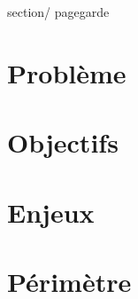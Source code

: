 \documentclass[french, 11pt, a4paper]{article}
\begin{document}
\thispagestyle {plain}

 {section/} {pagegarde}
\newpage

\tableofcontents
\newpage

\section {Problème}


\section {Objectifs}


\section {Enjeux}


\section {Périmètre}
\end{document}
